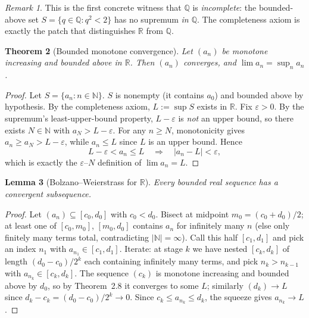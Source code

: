\documentclass[11pt]{article}
\newtheorem{theorem}{Theorem}[section]
\newtheorem{lemma}[theorem]{Lemma}
\theoremstyle{remark}
\newtheorem{remark}[theorem]{Remark}
\begin{document}
\begin{remark}
This is the first concrete witness that $\mathbb{Q}$ is \emph{incomplete}: the bounded-above set $S = \{q \in \mathbb{Q} : q^2 < 2\}$ has no supremum \emph{in $\mathbb{Q}$}. The completeness axiom is exactly the patch that distinguishes $\mathbb{R}$ from $\mathbb{Q}$.
\end{remark}

\begin{theorem}[Bounded monotone convergence]
Let $(a_n)$ be monotone increasing and bounded above in $\mathbb{R}$. Then $(a_n)$ converges, and $\lim a_n = \sup_n a_n$.
\end{theorem}

\begin{proof}
Let $S = \{a_n : n \in \mathbb{N}\}$. $S$ is nonempty (it contains $a_0$) and bounded above by hypothesis. By the completeness axiom, $L := \sup S$ exists in $\mathbb{R}$. Fix $\varepsilon > 0$. By the supremum's least-upper-bound property, $L - \varepsilon$ is \emph{not} an upper bound, so there exists $N \in \mathbb{N}$ with $a_N > L - \varepsilon$. For any $n \geq N$, monotonicity gives $a_n \geq a_N > L - \varepsilon$, while $a_n \leq L$ since $L$ is an upper bound. Hence
\[
L - \varepsilon < a_n \leq L \quad \Longrightarrow \quad |a_n - L| < \varepsilon,
\]
which is exactly the $\varepsilon$--$N$ definition of $\lim a_n = L$.
\end{proof}

\begin{lemma}[Bolzano--Weierstrass for $\mathbb{R}$]
Every bounded real sequence has a convergent subsequence.
\end{lemma}

\begin{proof}
Let $(a_n) \subseteq [c_0, d_0]$ with $c_0 < d_0$. Bisect at midpoint $m_0 = (c_0 + d_0)/2$; at least one of $[c_0, m_0]$, $[m_0, d_0]$ contains $a_n$ for infinitely many $n$ (else only finitely many terms total, contradicting $|\mathbb{N}| = \infty$). Call this half $[c_1, d_1]$ and pick an index $n_1$ with $a_{n_1} \in [c_1, d_1]$. Iterate: at stage $k$ we have nested $[c_k, d_k]$ of length $(d_0 - c_0) / 2^k$ each containing infinitely many terms, and pick $n_k > n_{k-1}$ with $a_{n_k} \in [c_k, d_k]$. The sequence $(c_k)$ is monotone increasing and bounded above by $d_0$, so by Theorem~2.8 it converges to some $L$; similarly $(d_k) \to L$ since $d_k - c_k = (d_0 - c_0)/2^k \to 0$. Since $c_k \leq a_{n_k} \leq d_k$, the squeeze gives $a_{n_k} \to L$.
\end{proof}
\end{document}
